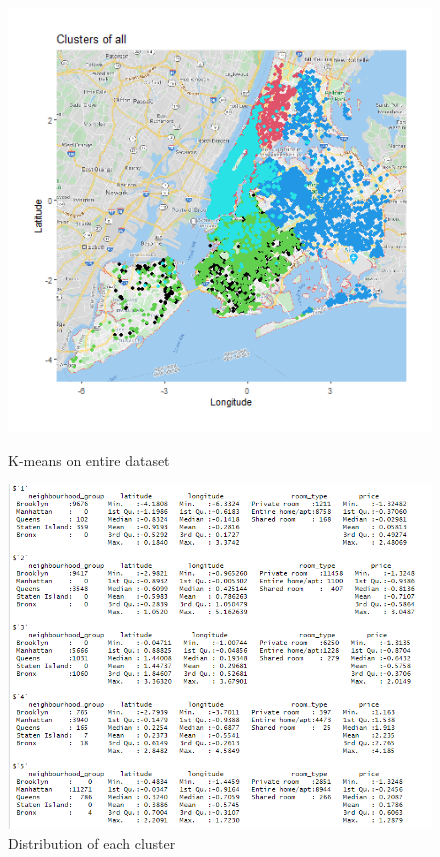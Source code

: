 \documentclass{FR16}
\begin{document}
\begin{figure}[!htb]
   \begin{minipage}{0.48\textwidth}
     \centering
    \includegraphics[width=1\textwidth]{figures/clust-all.PNG} 
 \caption{\label{fig:22} K-means on entire dataset}
   \end{minipage}\hfill
   \begin{minipage}{0.48\textwidth}
     \centering
       \includegraphics[width=1\textwidth]{figures/clust-summary.PNG} 
 \caption{\label{fig:23} Distribution of each cluster}
   \end{minipage}
   
\end{figure}
\end{document}
